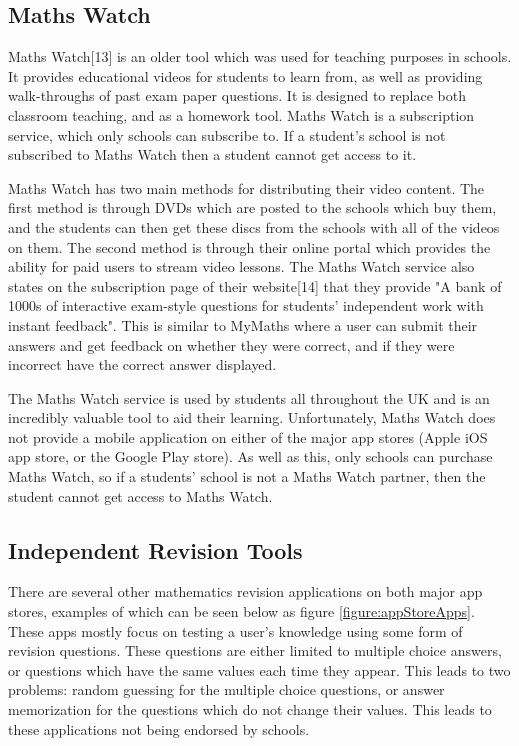 \documentclass{article}
\begin{document}
\subsection{Maths Watch}

Maths Watch[13] is an older tool which was used for teaching purposes in schools. It provides educational videos for students to learn from, as well as providing walk-throughs of past exam paper questions. It is designed to replace both classroom teaching, and as a homework tool. Maths Watch is a subscription service, which only schools can subscribe to. If a student's school is not subscribed to Maths Watch then a student cannot get access to it. \par

Maths Watch has two main methods for distributing their video content. The first method is through DVDs which are posted to the schools which buy them, and the students can then get these discs from the schools with all of the videos on them. The second method is through their online portal which provides the ability for paid users to stream video lessons. The Maths Watch service also states on the subscription page of their website[14] that they provide "A bank of 1000s of interactive exam-style questions for students' independent work with instant feedback". This is similar to MyMaths where a user can submit their answers and get feedback on whether they were correct, and if they were incorrect have the correct answer displayed. \par

The Maths Watch service is used by students all throughout the UK and is an incredibly valuable tool to aid their learning. Unfortunately, Maths Watch does not provide a mobile application on either of the major app stores (Apple iOS app store, or the Google Play store). As well as this, only schools can purchase Maths Watch, so if a students' school is not a Maths Watch partner, then the student cannot get access to Maths Watch. \par

\subsection{Independent Revision Tools}

There are several other mathematics revision applications on both major app stores, examples of which can be seen below as figure \ref{figure:appStoreApps}. These apps mostly focus on testing a user's knowledge using some form of revision questions. These questions are either limited to multiple choice answers, or questions which have the same values each time they appear. This leads to two problems: random guessing for the multiple choice questions, or answer memorization for the questions which do not change their values. This leads to these applications not being endorsed by schools. \par
\end{document}
